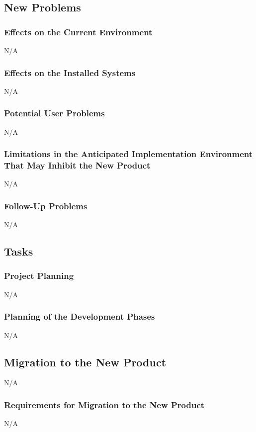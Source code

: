 \documentclass[12pt]{article}
\begin{document}
\subsection{New Problems}


\subsubsection{Effects on the Current Environment}
N/A

\subsubsection{Effects on the Installed Systems }
N/A

\subsubsection{Potential User Problems}
N/A

\subsubsection{Limitations in the Anticipated Implementation Environment That May Inhibit the New Product}
N/A

\subsubsection{Follow-Up Problems}
N/A

\subsection{Tasks}

\subsubsection{Project Planning}
N/A

\subsubsection{Planning of the Development Phases}
N/A

\subsection{Migration to the New Product}
N/A

\subsubsection{Requirements for Migration to the New Product}
N/A
\end{document}
